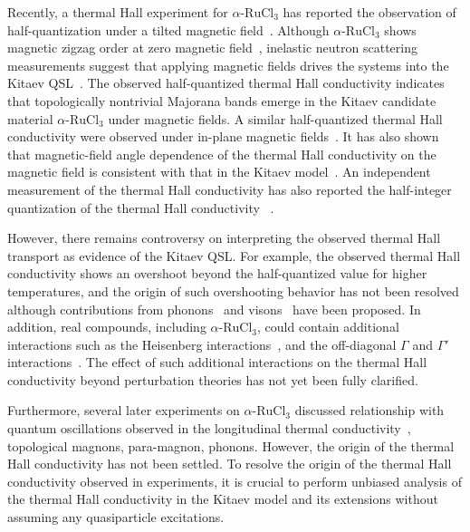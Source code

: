 \documentclass[twocolumn,superscriptaddress,showpacs, longbibliography, aps, prb]{revtex4-2}
\begin{document}
Recently, a thermal Hall experiment for $\alpha$-$\mathrm{RuCl_3}$ 
has reported the observation of half-quantization under a tilted magnetic field~\cite{Kasahara_Nature2018}.
Although $\alpha$-$\mathrm{RuCl_3}$ shows magnetic zigzag order at zero magnetic field~{\cite{Sears_PRB2015,Williams_PRB2015,Cao_PRB2016}}, 
inelastic neutron scattering measurements %
suggest that applying magnetic fields %
drives the systems into
the Kitaev QSL~\cite{Banerjee_npjQ2018}.
The observed half-quantized thermal Hall conductivity indicates that topologically nontrivial Majorana bands emerge in the Kitaev candidate material
$\alpha$-$\mathrm{RuCl_3}$ under magnetic fields. 
A similar half-quantized thermal Hall conductivity 
were observed under in-plane magnetic fields~\cite{Yamashita_PRB2020}.
It has also shown that %
magnetic-field angle dependence of the thermal Hall conductivity
on the magnetic field is consistent with %
that in the Kitaev model~\cite{Yokoi_Science2021}.
An independent measurement of the thermal Hall conductivity has also %
reported the half-integer quantization of the thermal Hall conductivity
~\cite{Bruin_NPhys2022}.

However, there remains controversy on interpreting the observed thermal Hall transport as %
evidence of the Kitaev QSL. 
For example, the observed thermal Hall conductivity shows an overshoot %
beyond the half-quantized value 
for higher temperatures, and the origin of such overshooting behavior has not been resolved  %
although contributions from phonons~\cite{Ye2018Quantization,Vinkler2018} and visons~\cite{Joy2022} have been proposed. 
In addition, real compounds, including $\alpha$-$\mathrm{RuCl_3}$, could contain additional interactions 
such as the Heisenberg interactions~\cite{Chaloupka_PRL2010,Chaloupka_PRL2013}, and the off-diagonal $\Gamma$ and $\Gamma'$ interactions~\cite{Rau2014,Rau2014pre,Winter2016}. 
The effect of such additional interactions on the thermal Hall conductivity 
beyond %
perturbation theories \cite{TakikawaF2020, YamadaF2021} %
has not yet been fully clarified. %

Furthermore, several later experiments %
on $\alpha$-$\mathrm{RuCl_3}$ discussed relationship 
with quantum oscillations observed in the longitudinal thermal conductivity~\cite{Czajka_NPhy2021}, 
 topological magnons\cite{Czajka_NMat2023}, 
 para-magnon\cite{Hentrich_PRB2019}, 
 phonons\cite{Lefra_PRX2022}. 
However, the origin of the thermal Hall conductivity has not been settled. 
To resolve the origin of the thermal Hall conductivity observed in experiments, 
it is %
crucial to perform unbiased analysis  
of the thermal Hall conductivity in the Kitaev model and its extensions without 
assuming any quasiparticle excitations.
\end{document}
